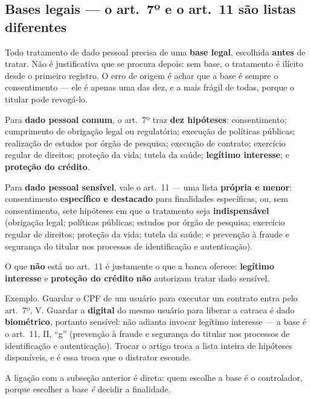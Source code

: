 \subsection{Bases legais --- o art.\ 7º e o art.\ 11 são listas diferentes}

Todo tratamento de dado pessoal precisa de uma \textbf{base legal}, escolhida
\textbf{antes} de tratar. Não é justificativa que se procura depois: sem base,
o tratamento é ilícito desde o primeiro registro. O erro de origem é achar que
a base é sempre o consentimento --- ele é apenas uma das dez, e a mais frágil
de todas, porque o titular pode revogá-lo.

\begin{conceito}
Para \textbf{dado pessoal comum}, o art.\ 7º traz \textbf{dez hipóteses}:
consentimento; cumprimento de obrigação legal ou regulatória; execução de
políticas públicas; realização de estudos por órgão de pesquisa; execução de
contrato; exercício regular de direitos; proteção da vida; tutela da saúde;
\textbf{legítimo interesse}; e \textbf{proteção do crédito}.

Para \textbf{dado pessoal sensível}, vale o art.\ 11 --- uma lista
\textbf{própria e menor}: consentimento \textbf{específico e destacado} para
finalidades específicas, ou, sem consentimento, sete hipóteses em que o
tratamento seja \textbf{indispensável} (obrigação legal; políticas públicas;
estudos por órgão de pesquisa; exercício regular de direitos; proteção da
vida; tutela da saúde; e prevenção à fraude e segurança do titular nos
processos de identificação e autenticação).

O que \textbf{não} está no art.\ 11 é justamente o que a banca oferece:
\textbf{legítimo interesse} e \textbf{proteção do crédito} \textbf{não}
autorizam tratar dado sensível.
\end{conceito}

Exemplo. Guardar o CPF de um usuário para executar um contrato entra pelo
art.\ 7º, V. Guardar a \textbf{digital} do mesmo usuário para liberar a
catraca é dado \textbf{biométrico}, portanto sensível: não adianta invocar
legítimo interesse --- a base é o art.\ 11, II, ``g'' (prevenção à fraude e
segurança do titular nos processos de identificação e autenticação). Trocar o
artigo troca a lista inteira de hipóteses disponíveis, e é essa troca que o
distrator esconde.

A ligação com a subseção anterior é direta: quem escolhe a base é o
controlador, porque escolher a base \emph{é} decidir a finalidade.

